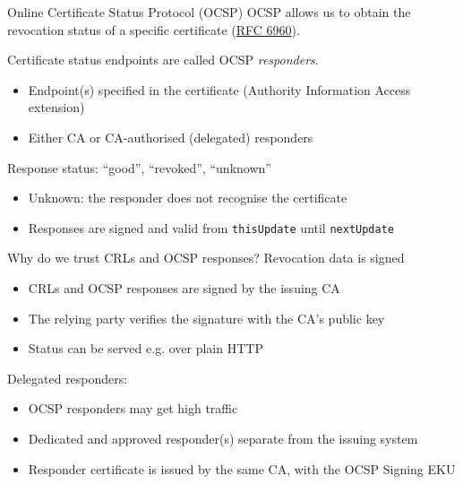 \begin{frame}{Online Certificate Status Protocol (OCSP)}
  OCSP allows us to obtain the revocation status of a specific certificate (\href{https://datatracker.ietf.org/doc/html/rfc6960}{RFC 6960}).

  \vspace*{0.5em}

  \pause
  Certificate status endpoints are called OCSP \emph{responders}.
  \begin{itemize}[<+(1)->]
    \item Endpoint(s) specified in the certificate (Authority Information Access extension)
    \item Either CA or CA-authorised (delegated) responders
  \end{itemize}

  \vspace*{0.5em}

  \pause
  Response status: \enquote{good}, \enquote{revoked}, \enquote{unknown}
  \begin{itemize}[<+(1)->]
    \item Unknown: the responder does not recognise the certificate
    \item Responses are signed and valid from \texttt{thisUpdate} until \texttt{nextUpdate}
  \end{itemize}
\end{frame}

\begin{frame}{Why do we trust CRLs and OCSP responses?}
  Revocation data is signed
  \begin{itemize}[<+(1)->]
    \item CRLs and OCSP responses are signed by the issuing CA
    \item The relying party verifies the signature with the CA's public key
    \item Status can be served e.g. over plain HTTP
  \end{itemize}

  \vspace*{0.5em}

  \pause
  Delegated responders:
  \begin{itemize}[<+(1)->]
    \item OCSP responders may get high traffic
    \item Dedicated and approved responder(s) separate from the issuing system
    \item Responder certificate is issued by the same CA, with the OCSP Signing EKU
  \end{itemize}
\end{frame}

